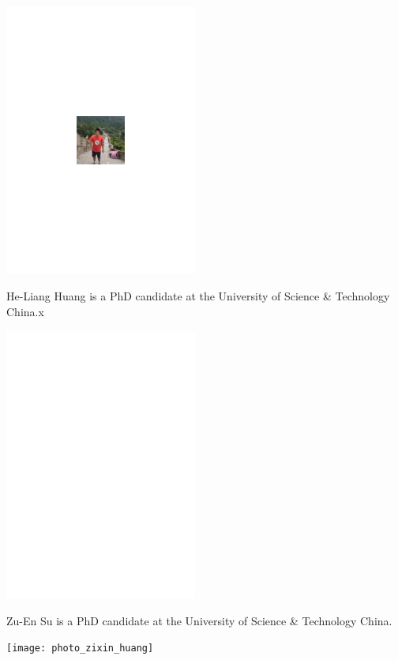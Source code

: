 \begin{center}
\includegraphics[clip=true, width=0.475\textwidth]{photo_heliang_huang}
\end{center}

He-Liang Huang is a PhD candidate at the University of Science \& Technology China.x

%
%

\begin{center}
\includegraphics[clip=true, width=0.475\textwidth]{photo_zuen_su}
\end{center}

Zu-En Su is a PhD candidate at the University of Science \& Technology China.


%
%

\begin{center}
\texttt{[image: photo\_zixin\_huang]}
\end{center}

